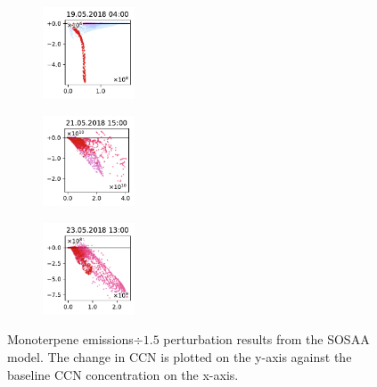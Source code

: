 \begin{figure}[H]
    \begin{subfigure}
        \centering
        \includegraphics[width=0.30\textwidth,valign=t]{evaluation/figures/perturbations/perturbation-19.05.2018:04.00-monoterpenes-div-1.5.pdf}
    \end{subfigure}
    \begin{subfigure}
        \centering
        \includegraphics[width=0.30\textwidth,valign=t]{evaluation/figures/perturbations/perturbation-21.05.2018:15.00-monoterpenes-div-1.5.pdf}
    \end{subfigure}
    \begin{subfigure}
        \centering
        \includegraphics[width=0.30\textwidth,valign=t]{evaluation/figures/perturbations/perturbation-23.05.2018:13.00-monoterpenes-div-1.5.pdf}
    \end{subfigure}

    \caption[Monoterpene emissions$\div 1.5$ perturbation SOSAA results]{Monoterpene emissions$\div 1.5$ perturbation results from the SOSAA model. The change in CCN is plotted on the y-axis against the baseline CCN concentration on the x-axis.}
    \label{fig:sosaa-perturbation-monoterpenes-div-1.5}
\end{figure}

